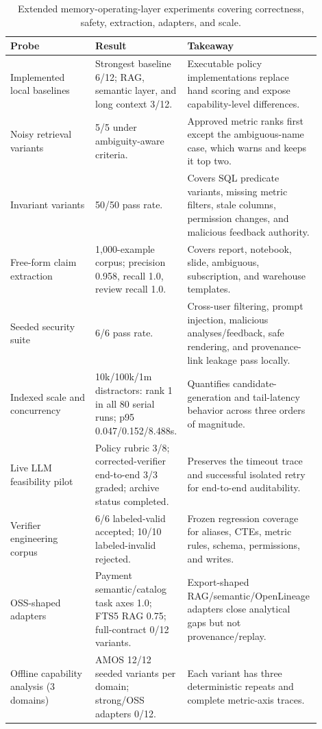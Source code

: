 \documentclass[10pt]{article}
\newcommand{\amos}{\textsc{AMOS}\xspace}
\begin{document}
\begin{table}[p]
\centering
\scriptsize
\setlength{\tabcolsep}{3pt}
\begin{tabular}{L{0.27\linewidth}L{0.21\linewidth}L{0.42\linewidth}}
\toprule
\textbf{Probe} & \textbf{Result} & \textbf{Takeaway} \\
\midrule
Implemented local baselines & Strongest baseline 6/12; RAG, semantic layer, and long context 3/12. & Executable policy implementations replace hand scoring and expose capability-level differences. \\
Noisy retrieval variants & 5/5 under ambiguity-aware criteria. & Approved metric ranks first except the ambiguous-name case, which warns and keeps it top two. \\
Invariant variants & 50/50 pass rate. & Covers SQL predicate variants, missing metric filters, stale columns, permission changes, and malicious feedback authority. \\
Free-form claim extraction & 1{,}000-example corpus; precision 0.958, recall 1.0, review recall 1.0. & Covers report, notebook, slide, ambiguous, subscription, and warehouse templates. \\
Seeded security suite & 6/6 pass rate. & Cross-user filtering, prompt injection, malicious analyses/feedback, safe rendering, and provenance-link leakage pass locally. \\
Indexed scale and concurrency & 10k/100k/1m distractors: rank 1 in all 80 serial runs; p95 0.047/0.152/8.488s. & Quantifies candidate-generation and tail-latency behavior across three orders of magnitude. \\
Live LLM feasibility pilot & Policy rubric 3/8; corrected-verifier end-to-end 3/3 graded; archive status completed. & Preserves the timeout trace and successful isolated retry for end-to-end auditability. \\
Verifier engineering corpus & 6/6 labeled-valid accepted; 10/10 labeled-invalid rejected. & Frozen regression coverage for aliases, CTEs, metric rules, schema, permissions, and writes. \\
OSS-shaped adapters & Payment semantic/catalog task axes 1.0; FTS5 RAG 0.75; full-contract 0/12 variants. & Export-shaped RAG/semantic/OpenLineage adapters close analytical gaps but not provenance/replay. \\
Offline capability analysis (3 domains) & \amos 12/12 seeded variants per domain; strong/OSS adapters 0/12. & Each variant has three deterministic repeats and complete metric-axis traces. \\
\bottomrule
\end{tabular}
\caption{Extended memory-operating-layer experiments covering correctness, safety, extraction, adapters, and scale.}
\label{tab:extended-results}
\end{table}
\end{document}
